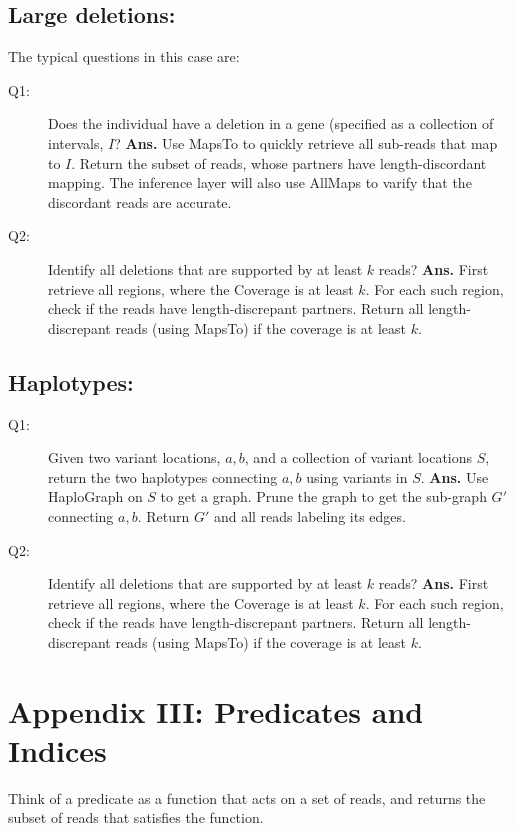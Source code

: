 \documentclass[10pt]{article}
\begin{document}
\subsection{Large deletions:}
The typical questions in this case are:
\begin{description}
\item [Q1:] Does the individual have a deletion in a gene (specified
  as a collection of intervals, $I$? {\bf Ans.} Use {\sc MapsTo} to
  quickly retrieve all sub-reads that map to $I$. Return the subset of
  reads, whose partners have length-discordant mapping. The inference
  layer will also use {\sc AllMaps} to varify that the discordant
  reads are accurate.
\item [Q2:] Identify all deletions that are supported by at least $k$
  reads? {\bf Ans.} First retrieve all regions, where the {\sc
    Coverage} is at least $k$. For each such region, check if the
  reads have length-discrepant partners. Return all length-discrepant
  reads (using {\sc MapsTo}) if the coverage is at least $k$.
\end{description}

\subsection{Haplotypes:}
\begin{description}
\item [Q1:] Given two variant locations, $a,b$, and a collection of
  variant locations $S$, return the two haplotypes connecting $a,b$
  using variants in $S$. {\bf Ans.} Use {\sc HaploGraph} on $S$ to get
  a graph. Prune the graph to get the sub-graph $G'$ connecting
  $a,b$. Return $G'$ and all reads labeling its edges.

\item [Q2:] Identify all deletions that are supported by at least $k$
  reads? {\bf Ans.} First retrieve all regions, where the {\sc
    Coverage} is at least $k$. For each such region, check if the
  reads have length-discrepant partners. Return all length-discrepant
  reads (using {\sc MapsTo}) if the coverage is at least $k$.
\end{description}
\newpage
\section{Appendix III: Predicates and Indices}

Think of a predicate as a function that acts on a set of reads, and
returns the subset of reads that satisfies the function.
\end{document}
